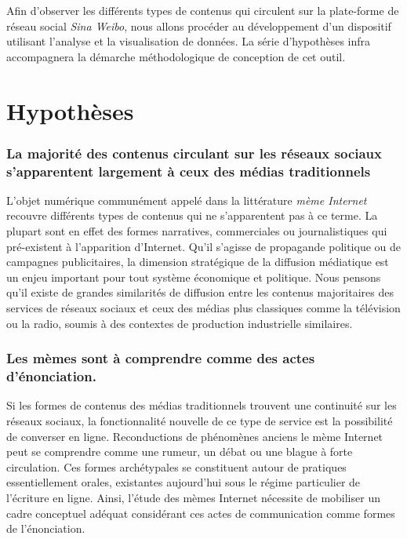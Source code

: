 Afin d'observer les différents types de contenus qui circulent sur la plate-forme de réseau social \textit{Sina Weibo}, nous allons procéder au développement d'un dispositif utilisant l'analyse et la visualisation de données. La série d'hypothèses infra accompagnera la démarche méthodologique de conception de cet outil.

\section*{Hypothèses}
\label{sec:hypotheses}

\subsubsection{La majorité des contenus circulant sur les réseaux sociaux s'apparentent largement à ceux des médias traditionnels} 

L'objet numérique communément appelé dans la littérature \textit{mème Internet} recouvre différents types de contenus qui ne s'apparentent pas à ce terme. La plupart sont en effet des formes narratives, commerciales ou journalistiques qui pré-existent à l'apparition d'Internet. Qu{\textquoteright}il s{\textquoteright}agisse de propagande politique ou de campagnes publicitaires, la dimension stratégique de la diffusion médiatique est un enjeu important pour tout système économique et politique. Nous pensons qu{\textquoteright}il existe de grandes similarités de diffusion entre les contenus majoritaires des services de réseaux sociaux et ceux des médias plus classiques comme la télévision ou la radio, soumis à des contextes de production industrielle similaires.

\subsubsection{Les mèmes sont à comprendre comme des actes d'énonciation.}

Si les formes de contenus des médias traditionnels trouvent une continuité sur les réseaux sociaux, la fonctionnalité nouvelle de ce type de service est la possibilité de converser en ligne. Reconductions de phénomènes anciens le mème Internet peut se comprendre comme une rumeur, un débat ou une blague à forte circulation. Ces formes archétypales se constituent autour de pratiques essentiellement orales, existantes aujourd'hui sous le régime particulier de l'écriture en ligne. Ainsi, l'étude des mèmes Internet nécessite de mobiliser un cadre conceptuel adéquat considérant ces actes de communication comme formes de l'énonciation.


